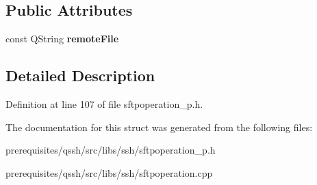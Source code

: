 \subsection*{Public Attributes}
\begin{DoxyCompactItemize}
\item 
\mbox{\label{struct_q_ssh_1_1_internal_1_1_sftp_rm_afedbf79f5ae2554872038b69e2b436c3}} 
const Q\+String {\bfseries remote\+File}
\end{DoxyCompactItemize}


\subsection{Detailed Description}


Definition at line 107 of file sftpoperation\+\_\+p.\+h.



The documentation for this struct was generated from the following files\+:\begin{DoxyCompactItemize}
\item 
prerequisites/qssh/src/libs/ssh/sftpoperation\+\_\+p.\+h\item 
prerequisites/qssh/src/libs/ssh/sftpoperation.\+cpp\end{DoxyCompactItemize}
